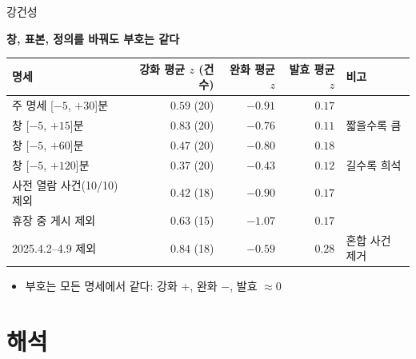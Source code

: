 \documentclass[aspectratio=169,9pt,t]{beamer}
\newcommand{\msg}[1]{{\fontsize{11.5}{15}\selectfont\bfseries\color{navy}\RaggedRight #1\par}\vspace{2.0mm}}
\renewcommand{\arraystretch}{1.3}
\newcommand{\tfs}{\fontsize{7.5}{9.4}\selectfont\renewcommand{\arraystretch}{1.18}}
\begin{document}
\begin{frame}{강건성}
\msg{창, 표본, 정의를 바꿔도 부호는 같다}
\begingroup\tfs
\begin{tabularx}{\textwidth}{@{}L{0.34\textwidth}rrrY@{}}
\toprule
명세 & 강화 평균 $z$ (건수) & 완화 평균 $z$ & 발효 평균 $z$ & 비고\\
\midrule
주 명세 [$-5$, $+30$]분 & $0.59$ (20) & $-0.91$ & $0.17$ & \\
창 [$-5$, $+15$]분 & $0.83$ (20) & $-0.76$ & $0.11$ & 짧을수록 큼\\
창 [$-5$, $+60$]분 & $0.47$ (20) & $-0.80$ & $0.18$ & \\
창 [$-5$, $+120$]분 & $0.37$ (20) & $-0.43$ & $0.12$ & 길수록 희석\\
사전 열람 사건(10/10) 제외 & $0.42$ (18) & $-0.90$ & $0.17$ & \\
휴장 중 게시 제외 & $0.63$ (15) & $-1.07$ & $0.17$ & \\
2025.4.2--4.9 제외 & $0.84$ (18) & $-0.59$ & $0.28$ & 혼합 사건 제거\\
\bottomrule
\end{tabularx}\endgroup
\vspace{1.5mm}
\begin{itemize}
\item 부호는 모든 명세에서 같다: 강화 $+$, 완화 $-$, 발효 $\approx0$
\end{itemize}
\end{frame}

\section{해석}
\end{document}

